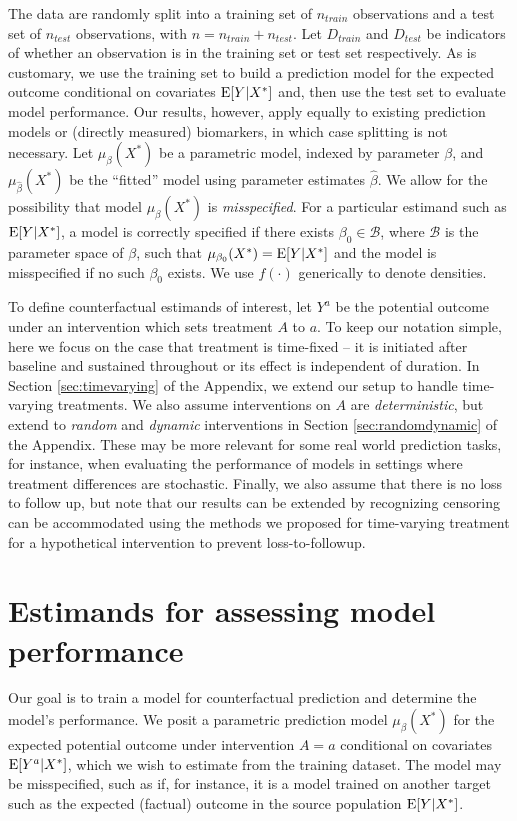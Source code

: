 The data are randomly split into a training set of $n_{train}$ observations and a test set of $n_{test}$ observations, with $n = n_{train} + n_{test}$. Let $D_{train}$ and $D_{test}$ be indicators of whether an observation is in the training set or test set respectively. As is customary, we use the training set to build a prediction model for the expected outcome conditional on covariates $\operatorname{E}[Y | X^*]$ and, then use the test set to evaluate model performance. Our results, however, apply equally to existing prediction models or (directly measured) biomarkers, in which case splitting is not necessary. Let $\mu_{\beta}(X^*)$ be a parametric model, indexed by parameter $\beta$, and $\mu_{\widehat{\beta}}(X^*)$ be the ``fitted'' model using parameter estimates $\widehat{\beta}$. We allow for the possibility that model $\mu_{\beta}(X^*)$ is \textit{misspecified}. For a particular estimand such as $\operatorname{E}[Y | X^*]$, a model is correctly specified if there exists $\beta_0 \in \mathcal{B}$, where $\mathcal{B}$ is the parameter space of $\beta$, such that $\mu_{\beta_0}(X^*) = \operatorname{E}[Y | X^*]$ and the model is misspecified if no such $\beta_0$ exists. We use $f(\cdot)$ generically to denote densities.

To define counterfactual estimands of interest, let $Y^a$ be the potential outcome under an intervention which sets treatment $A$ to $a$. To keep our notation simple, here we focus on the case that treatment is time-fixed -- it is initiated after baseline and sustained throughout or its effect is independent of duration. In Section \ref{sec:timevarying} of the Appendix, we extend our setup to handle time-varying treatments.  We also assume interventions on $A$ are \textit{deterministic}, but extend to \textit{random} and \textit{dynamic} interventions in Section \ref{sec:randomdynamic} of the Appendix. These may be more relevant for some real world prediction tasks, for instance, when evaluating the performance of models in settings where treatment differences are stochastic. Finally, we also assume that there is no loss to follow up, but note that our results can be extended by recognizing censoring can be accommodated using the methods we proposed for time-varying treatment \cite{hernan_causal_2020} for a hypothetical intervention to prevent loss-to-followup.  

\section{Estimands for assessing model performance} \label{sec:targets}
Our goal is to train a model for counterfactual prediction and determine the model's performance. We posit a parametric prediction model $\mu_{\beta}(X^*)$ for the expected potential outcome under intervention $A = a$ conditional on covariates $\operatorname{E}[Y^a | X^*]$, which we wish to estimate from the training dataset. The model may be misspecified, such as if, for instance, it is a model trained on another target such as the expected (factual) outcome in the source population $\operatorname{E}[Y | X^*]$.

